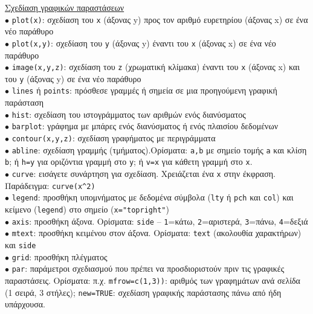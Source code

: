 \documentclass[a4paper,10pt,twocolumn]{article}
\begin{document}
\noindent \underline{Σχεδίαση γραφικών παραστάσεων}\\
$\bullet$ \texttt{plot(x)}: σχεδίαση του \texttt{x} (άξονας y) προς τον αριθμό ευρετηρίου (άξονας x) σε ένα 
νέο παράθυρο\\
$\bullet$ \texttt{plot(x,y)}: σχεδίαση του \texttt{y} (άξονας y) έναντι του \texttt{x} (άξονας x) σε ένα νέο
παράθυρο\\
$\bullet$ \texttt{image(x,y,z)}: σχεδίαση του \texttt{z} (χρωματική κλίμακα) έναντι του \texttt{x} (άξονας x)
και του \texttt{y} (άξονας y) σε ένα νέο παράθυρο\\
$\bullet$ \texttt{lines} ή \texttt{points}: πρόσθεσε γραμμές ή σημεία σε μια προηγούμενη γραφική παράσταση\\
$\bullet$ \texttt{hist}: σχεδίαση του ιστογράμματος των αριθμών ενός διανύσματος\\
$\bullet$ \texttt{barplot}: γράφημα με μπάρες ενός διανύσματος ή ενός πλαισίου δεδομένων\\
$\bullet$ \texttt{contour(x,y,z)}: σχεδίαση γραφήματος με περιγράμματα \\
$\bullet$ \texttt{abline}: σχεδίαση γραμμής (τμήματος).Ορίσματα: \texttt{a,b} με σημείο τομής \texttt{a} και
κλίση \texttt{b}; ή \texttt{h=y} για οριζόντια γραμμή στο \texttt{y}; ή \texttt{v=x} για κάθετη γραμμή στο
\texttt{x}.\\
$\bullet$ \texttt{curve}: εισάγετε συνάρτηση για σχεδίαση. Χρειάζεται ένα \texttt{x} στην έκφραση. Παράδειγμα:
\verb!curve(x^2)! \\
$\bullet$ \texttt{legend}: προσθήκη υπομνήματος με δεδομένα σύμβολα (\texttt{lty} ή \texttt{pch} και
\texttt{col}) και κείμενο (\texttt{legend}) στο σημείο (\texttt{x="topright"})\\
$\bullet$ \texttt{axis}: προσθήκη άξονα. Ορίσματα: \texttt{side} -- \texttt{1}=κάτω, \texttt{2}=αριστερά,
\texttt{3}=πάνω, \texttt{4}=δεξιά\\
$\bullet$ \texttt{mtext}: προσθήκη κειμένου στον άξονα. Ορίσματα: \texttt{text} (ακολουθία χαρακτήρων) και
\texttt{side}\\
$\bullet$ \texttt{grid}: προσθήκη πλέγματος\\
$\bullet$ \texttt{par}: παράμετροι σχεδιασμού που πρέπει να προσδιοριστούν πριν τις γραφικές παραστάσεις. 
Ορίσματα: π.χ. \texttt{mfrow=c(1,3))}: αριθμός των γραφημάτων ανά σελίδα (1 σειρά, 3 στήλες); \texttt{new=TRUE}:
σχεδίαση γραφικής παράστασης πάνω από ήδη υπάρχουσα.\\
\end{document}
